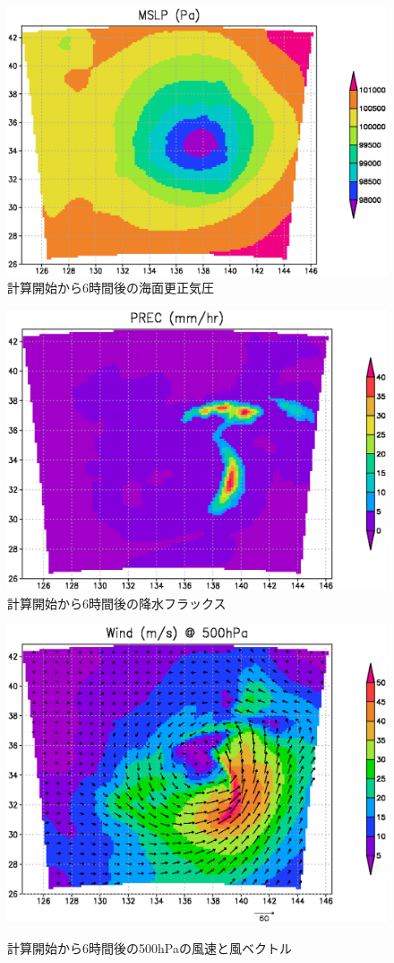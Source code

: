 \begin{figure}[h]
\begin{center}
  \includegraphics[width=0.55\hsize]{./figure/real_mslp.eps}\\
  \caption{計算開始から6時間後の海面更正気圧}
  \label{fig:real_mslp}
\end{center}
\begin{center}
  \includegraphics[width=0.55\hsize]{./figure/real_prec.eps}\\
  \caption{計算開始から6時間後の降水フラックス}
  \label{fig:real_prec}
\end{center}
\begin{center}
  \includegraphics[width=0.55\hsize]{./figure/real_wind.eps}\\
  \caption{計算開始から6時間後の500hPaの風速と風ベクトル}
  \label{fig:real_wind}
\end{center}
\end{figure}

